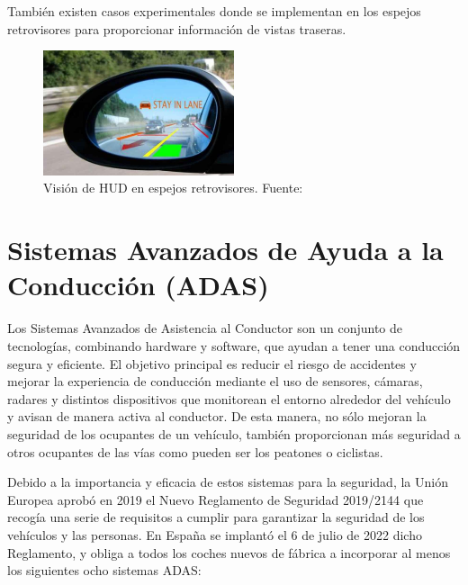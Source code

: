 \documentclass[12pt]{report} %
\begin{document}
También existen casos experimentales donde se implementan en los espejos retrovisores para proporcionar información de vistas traseras. 

\begin{figure}[H]
    \centering
    \includegraphics[width=0.5\textwidth]{retroHUD.png}
    \caption{Visión de HUD en espejos retrovisores. Fuente: \cite{hudPaper}}
    \label{fig:imagen10}
\end{figure}

\section{Sistemas Avanzados de Ayuda a la Conducción (ADAS)}

Los Sistemas Avanzados de Asistencia al Conductor son un conjunto de tecnologías, combinando hardware y software, que ayudan a tener una conducción segura y eficiente. El objetivo principal es reducir el riesgo de accidentes y mejorar la experiencia de conducción mediante el uso de sensores, cámaras, radares y distintos dispositivos que monitorean el entorno alrededor del vehículo y avisan de manera activa al conductor. De esta manera, no sólo mejoran la seguridad de los ocupantes de un vehículo, también proporcionan más seguridad a otros ocupantes de las vías como pueden ser los peatones o ciclistas.
\cite{adasDGT}

Debido a la importancia y eficacia de estos sistemas para la seguridad, la Unión Europea aprobó en 2019 el Nuevo Reglamento de Seguridad 2019/2144 \cite{adasDGT} que recogía una serie de requisitos a cumplir para garantizar la seguridad de los vehículos y las personas. En España se implantó el 6 de julio de 2022 dicho Reglamento, y obliga a todos los coches nuevos de fábrica a incorporar al menos los siguientes ocho sistemas ADAS: 
\end{document}
